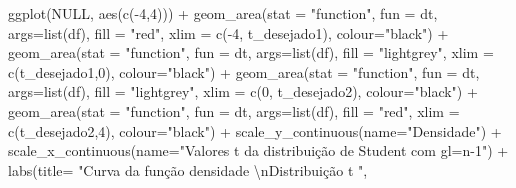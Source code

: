 \documentclass[
]{book}
\newenvironment{Shaded}{\begin{snugshade}}{\end{snugshade}}
\newcommand{\AttributeTok}[1]{\textcolor[rgb]{0.77,0.63,0.00}{#1}}
\newcommand{\ConstantTok}[1]{\textcolor[rgb]{0.00,0.00,0.00}{#1}}
\newcommand{\DecValTok}[1]{\textcolor[rgb]{0.00,0.00,0.81}{#1}}
\newcommand{\FunctionTok}[1]{\textcolor[rgb]{0.00,0.00,0.00}{#1}}
\newcommand{\NormalTok}[1]{#1}
\newcommand{\SpecialCharTok}[1]{\textcolor[rgb]{0.00,0.00,0.00}{#1}}
\newcommand{\StringTok}[1]{\textcolor[rgb]{0.31,0.60,0.02}{#1}}
\begin{document}
\begin{Shaded}
\begin{Highlighting}[]
\FunctionTok{ggplot}\NormalTok{(}\ConstantTok{NULL}\NormalTok{, }\FunctionTok{aes}\NormalTok{(}\FunctionTok{c}\NormalTok{(}\SpecialCharTok{{-}}\DecValTok{4}\NormalTok{,}\DecValTok{4}\NormalTok{))) }\SpecialCharTok{+}
  \FunctionTok{geom\_area}\NormalTok{(}\AttributeTok{stat =} \StringTok{"function"}\NormalTok{, }
            \AttributeTok{fun =}\NormalTok{ dt,}
            \AttributeTok{args=}\FunctionTok{list}\NormalTok{(df), }
            \AttributeTok{fill =} \StringTok{"red"}\NormalTok{, }
            \AttributeTok{xlim =} \FunctionTok{c}\NormalTok{(}\SpecialCharTok{{-}}\DecValTok{4}\NormalTok{, t\_desejado1),}
            \AttributeTok{colour=}\StringTok{"black"}\NormalTok{) }\SpecialCharTok{+}
  \FunctionTok{geom\_area}\NormalTok{(}\AttributeTok{stat =} \StringTok{"function"}\NormalTok{, }
            \AttributeTok{fun =}\NormalTok{ dt, }
            \AttributeTok{args=}\FunctionTok{list}\NormalTok{(df), }
            \AttributeTok{fill =} \StringTok{"lightgrey"}\NormalTok{, }
            \AttributeTok{xlim =} \FunctionTok{c}\NormalTok{(t\_desejado1,}\DecValTok{0}\NormalTok{),}
            \AttributeTok{colour=}\StringTok{"black"}\NormalTok{) }\SpecialCharTok{+}
  \FunctionTok{geom\_area}\NormalTok{(}\AttributeTok{stat =} \StringTok{"function"}\NormalTok{, }
            \AttributeTok{fun =}\NormalTok{ dt, }
            \AttributeTok{args=}\FunctionTok{list}\NormalTok{(df), }
            \AttributeTok{fill =} \StringTok{"lightgrey"}\NormalTok{, }
            \AttributeTok{xlim =} \FunctionTok{c}\NormalTok{(}\DecValTok{0}\NormalTok{, t\_desejado2),}
            \AttributeTok{colour=}\StringTok{"black"}\NormalTok{) }\SpecialCharTok{+}
  \FunctionTok{geom\_area}\NormalTok{(}\AttributeTok{stat =} \StringTok{"function"}\NormalTok{, }
            \AttributeTok{fun =}\NormalTok{ dt, }
            \AttributeTok{args=}\FunctionTok{list}\NormalTok{(df), }
            \AttributeTok{fill =} \StringTok{"red"}\NormalTok{, }
            \AttributeTok{xlim =} \FunctionTok{c}\NormalTok{(t\_desejado2,}\DecValTok{4}\NormalTok{),}
            \AttributeTok{colour=}\StringTok{"black"}\NormalTok{) }\SpecialCharTok{+}
  \FunctionTok{scale\_y\_continuous}\NormalTok{(}\AttributeTok{name=}\StringTok{"Densidade"}\NormalTok{) }\SpecialCharTok{+}
  \FunctionTok{scale\_x\_continuous}\NormalTok{(}\AttributeTok{name=}\StringTok{"Valores \textasciigrave{}\textasciigrave{}t\textquotesingle{}\textquotesingle{} da distribuição de Student com gl=n{-}1"}\NormalTok{)  }\SpecialCharTok{+}
  \FunctionTok{labs}\NormalTok{(}\AttributeTok{title=} \StringTok{"Curva da função densidade }\SpecialCharTok{\textbackslash{}n}\StringTok{Distribuição t "}\NormalTok{, }

\end{Highlighting}
\end{Shaded}
\end{document}
